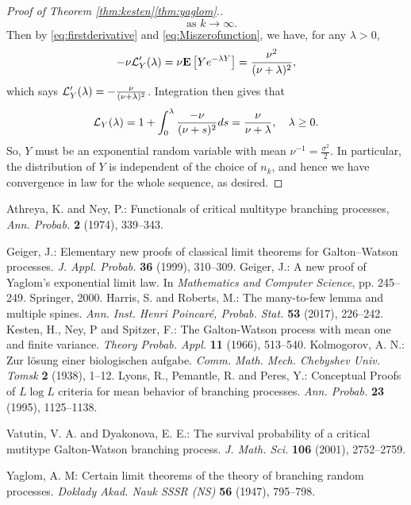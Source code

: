 \documentclass[12pt]{amsart}
\numberwithin{equation}{section}
\newcommand{\brac}[1]{\left[ #1 \right]}
\newcommand{\expct}{\mathbf E}
\begin{document}
\begin{proof}[Proof of Theorem \ref{thm:kesten}\eqref{thm:yaglom}.]
\begin{equation*}
		\quad
		\text{as } k\to \infty.
	\end{equation*}
	Then by \eqref{eq:firstderivative} and \eqref{eq:Miszerofunction}, we have, for any $\lambda >0$,
\begin{equation*}
	    -\nu\cL_Y'(\lambda)
	=
	    \nu\expct\brac{Ye^{-\lambda Y}}
    =	
		\frac{\nu^2}{(\nu+\lambda)^2},
\end{equation*}
	which says $\mathcal L_Y'(\lambda)=-\frac{\nu}{(\nu+\lambda)^2}$.
	Integration then gives that
\begin{equation*}
	    \mathcal L_Y(\lambda)
	=
	    1
	+
	    \int_0^\lambda\frac{-\nu}{(\nu+s)^2}ds
	=
		\frac{\nu}{\nu+\lambda},
		\quad
		\lambda \ge 0.
	\end{equation*}
	So, $Y$ must be an 	exponential random variable
	with mean $\nu^{-1}=\frac{\sigma^2}{2}$.
	In particular, the distribution of $Y$
	is independent of the choice of $n_k$, and hence we have convergence in law for the whole sequence, as desired.
\end{proof}
\vspace{.1in}
\begin{thebibliography}{99}

 Athreya, K.  and  Ney, P.: Functionals of critical multitype branching processes, {\it Ann.
Probab.} {\bf 2} (1974), 339--343.

	Geiger, J.:
	Elementary new proofs of classical limit theorems for Galton--Watson processes.
	{\it J. Appl. Probab.} \textbf{36} (1999), 310--309.
	Geiger, J.:
	A new proof of Yaglom's exponential limit law.
	In {\it Mathematics and Computer Science}, pp. 245--249.
	Springer, 2000.
	Harris, S. and Roberts, M.:
	The many-to-few lemma and multiple spines.
	{\it Ann.  Inst. Henri Poincar{\'e}, Probab. Stat.}
	\textbf{53} (2017), 226--242.
	Kesten, H.,  Ney, P and Spitzer, F.:
	The Galton-Watson process with mean one and finite variance.
	{\it Theory Probab. Appl.}
	\textbf{11} (1966), 513--540.
	Kolmogorov, A. N.:
	Zur l{\"o}sung einer biologischen aufgabe.
	{\it Comm. Math. Mech. Chebyshev Univ. Tomsk}
	\textbf{2} (1938), 1--12.
	Lyons, R.,  Pemantle, R. and Peres, Y.:
	Conceptual Proofs of $ L \log L $ criteria for mean behavior of branching processes.
	{\it Ann. Probab.} \textbf{23} (1995), 1125--1138.

 Vatutin, V. A. and Dyakonova,  E. E.: The survival probability of a critical mutitype Galton-Watson branching process. 
{\it J.  Math. Sci.} \textbf{106} (2001), 2752--2759.

	Yaglom, A. M:
	Certain limit theorems of the theory of branching random processes.
	{\it Doklady Akad. Nauk SSSR (NS)} \textbf{56} (1947), 795--798.
\end{thebibliography}
\end{document}
